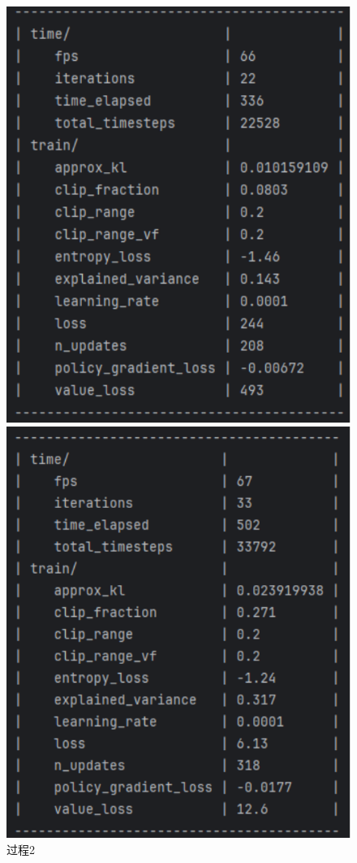 \begin{figure}[H]
\begin{minipage}{0.24\textwidth}
        \includegraphics[width=\textwidth]{images/training2.pdf}
	   \caption*{过程2}
    \end{minipage}%
    \begin{minipage}{0.24\textwidth}
        \centering
        \includegraphics[width=\textwidth]{images/training3.pdf}

\end{minipage}
\end{figure}
